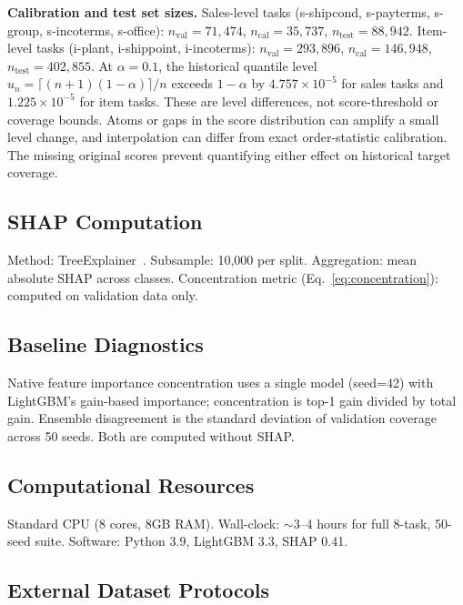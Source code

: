 \documentclass[accepted]{uai2026} %
\begin{document}
\noindent\textbf{Calibration and test set sizes.} Sales-level tasks (s-shipcond, s-payterms, s-group, s-incoterms, s-office): $n_{\text{val}} = 71{,}474$, $n_{\text{cal}} = 35{,}737$, $n_{\text{test}} = 88{,}942$. Item-level tasks (i-plant, i-shippoint, i-incoterms): $n_{\text{val}} = 293{,}896$, $n_{\text{cal}} = 146{,}948$, $n_{\text{test}} = 402{,}855$. At $\alpha=0.1$, the historical quantile level $u_n=\lceil(n+1)(1-\alpha)\rceil/n$ exceeds $1-\alpha$ by $4.757\times10^{-5}$ for sales tasks and $1.225\times10^{-5}$ for item tasks. These are level differences, not score-threshold or coverage bounds. Atoms or gaps in the score distribution can amplify a small level change, and interpolation can differ from exact order-statistic calibration. The missing original scores prevent quantifying either effect on historical target coverage.

\subsection{SHAP Computation}

Method: TreeExplainer~\citep{lundberg2020local}. Subsample: 10,000 per split. Aggregation: mean absolute SHAP across classes. Concentration metric (Eq.~\ref{eq:concentration}): computed on validation data only.

\subsection{Baseline Diagnostics}

Native feature importance concentration uses a single model (seed=42) with LightGBM's gain-based importance; concentration is top-1 gain divided by total gain. Ensemble disagreement is the standard deviation of validation coverage across 50 seeds. Both are computed without SHAP.

\subsection{Computational Resources}

Standard CPU (8 cores, 8GB RAM). Wall-clock: $\sim$3--4 hours for full 8-task, 50-seed suite. Software: Python 3.9, LightGBM 3.3, SHAP 0.41.

\subsection{External Dataset Protocols}\label{app:external_data}
\end{document}
